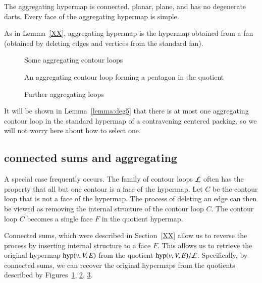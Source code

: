 \begin{lemma}
The aggregating hypermap is connected, planar, plane,
and has no degenerate darts.   Every face of the aggregating hypermap
is simple. 
\end{lemma}

As in Lemma~\ref{XX}, aggregating hypermap is the hypermap
obtained from a fan (obtained by deleting edges and
vertices from the standard fan).

\begin{figure}[htb]
  \centering
  \caption{Some aggregating contour loops} %
  \label{fig:agg}
\end{figure}

\begin{figure}[htb]
  \centering
  \caption{An aggregating contour loop forming a pentagon in the quotient}
  \label{fig:tri-pent}
\end{figure}

\begin{figure}[htb]
  \centering
  \caption{Further aggregating loops}
  \label{fig:degree6}
\end{figure}



It will be shown in
Lemma~\ref{lemma:deg5} that there is at most one aggregating
contour loop in the standard hypermap of a contravening centered packing,
so we will not worry here about how to select one.




\subsection{connected sums and aggregating}

A special case frequently occurs.  The family of contour loops
$\cal L$ often has the property that all but one contour is
a face of the hypermap.  Let $C$ be the contour loop that
is not a face of the hypermap.  The process of deleting an
edge can then be viewed as removing the internal structure
of the contour loop $C$.  The contour loop $C$ becomes a single
face $F$ in the quotient hypermap.

Connected sums, which were described in Section~\ref{XX} allow
us to reverse the process by inserting internal structure to
a face $F$.  This allows us to retrieve the original hypermap
${\operatorname{hyp}}(v,V,E)$
from the quotient
$\op{hyp}(v,V,E)/{\cal L}$.  Specifically, by connected sums, we can recover
the original hypermaps from the quotients described by
Figures~\ref{fig:agg}, \ref{fig:tri-pent}, \ref{fig:degree6}.


